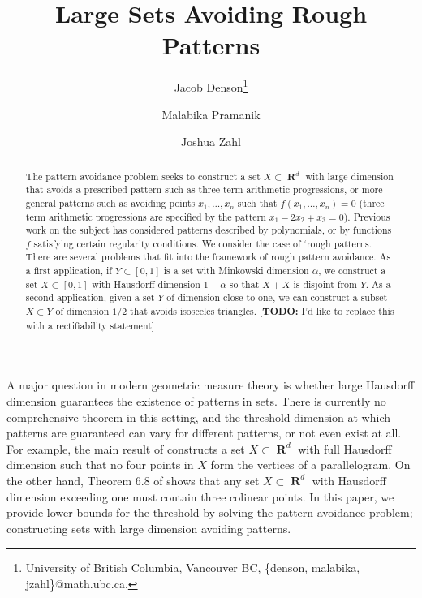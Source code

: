 \documentclass[dvipsnames,letterpaper,12pt]{article}
\title{Large Sets Avoiding Rough Patterns}
\author{Jacob Denson\thanks{University of British Columbia, Vancouver BC, \{denson, malabika, jzahl\}@math.ubc.ca.} \and Malabika Pramanik\footnotemark[1] \and Joshua Zahl\footnotemark[1]}
\theoremstyle{plain}
\DeclareMathOperator{\RR}{\mathbf{R}}
\begin{document}
\maketitle

\begin{abstract}
	The pattern avoidance problem seeks to construct a set $X\subset \RR^d$ with large dimension that avoids a prescribed pattern such as three term arithmetic progressions, or more general patterns such as avoiding points $x_1, \dots, x_n$ such that $f(x_1, \dots, x_n) = 0$ (three term arithmetic progressions are specified by the pattern $x_1 - 2x_2 + x_3 = 0$). Previous work on the subject has considered patterns described by polynomials, or by functions $f$ satisfying certain regularity conditions. We consider the case of `rough patterns.
	There are several problems that fit into the framework of rough pattern avoidance. As a first application, if $Y\subset[0,1]$ is a set with Minkowski dimension $\alpha$, we construct a set $X\subset[0,1]$ with Hausdorff dimension $1-\alpha$ so that $X+X$ is disjoint from $Y$. As a second application, given a set $Y$ of dimension close to one, we can construct a subset $X\subset Y$ of dimension $1/2$ that avoids isosceles triangles. [{\bf{TODO:}} I'd like to replace this with a rectifiability statement]
\end{abstract}













A major question in modern geometric measure theory is whether large Hausdorff dimension guarantees the existence of patterns in sets. There is currently no comprehensive theorem in this setting, and the threshold dimension at which patterns are guaranteed can vary for different patterns, or not even exist at all. For example, the main result of \cite{Maga} constructs a set $X \subset \RR^d$ with full Hausdorff dimension such that no four points in $X$ form the vertices of a parallelogram. On the other hand, Theorem 6.8 of \cite{Matilla} shows that any set $X \subset \RR^d$ with Hausdorff dimension exceeding one must contain three colinear points. In this paper, we provide lower bounds for the threshold by solving the pattern avoidance problem; constructing sets with large dimension avoiding patterns.
\end{document}
